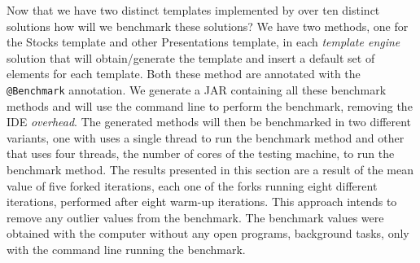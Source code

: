\noindent
Now that we have two distinct templates implemented by over ten distinct solutions how will we benchmark these solutions? We have two methods, one for the Stocks template and other Presentations template, in each \textit{template engine} solution that will obtain/generate the template and insert a default set of elements for each template. Both these method are annotated with the \texttt{@Benchmark} annotation. We generate a \ac{JAR} containing all these benchmark methods and will use the command line to perform the benchmark, removing the \ac{IDE} \textit{overhead}. The generated methods will then be benchmarked in two different variants, one with uses a single thread to run the benchmark method and other that uses four threads, the number of cores of the testing machine, to run the benchmark method. The results presented in this section are a result of the mean value of five forked iterations, each one of the forks running eight different iterations, performed after eight warm-up iterations. This approach intends to remove any outlier values from the benchmark. The benchmark values were obtained with the computer without any open programs, background tasks, only with the command line running the benchmark.

\pgfplotsset{compat=1.5}

